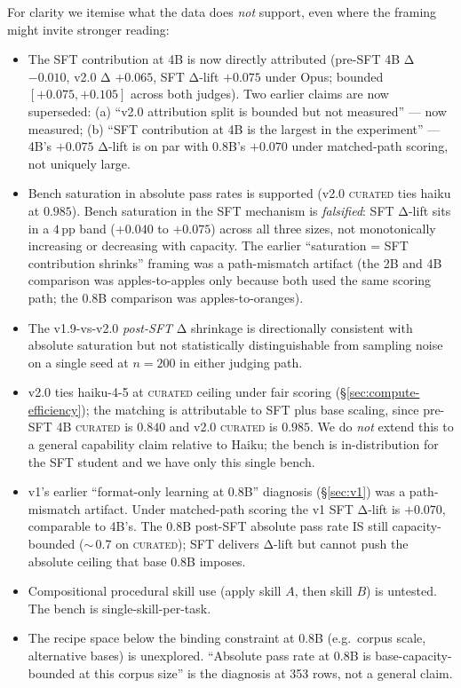 \documentclass[10pt]{article}
\newcommand{\CU}{\textsc{curated}\xspace}
\begin{document}
For clarity we itemise what the data does \emph{not} support, even where the framing might invite stronger reading:
\begin{itemize}[leftmargin=*, nosep]
  \item The SFT contribution at 4B is now directly attributed (pre-SFT 4B Δ $-0.010$, v2.0 Δ $+0.065$, SFT Δ-lift $+0.075$ under Opus; bounded $[+0.075, +0.105]$ across both judges). Two earlier claims are now superseded: (a) ``v2.0 attribution split is bounded but not measured'' --- now measured; (b) ``SFT contribution at 4B is the largest in the experiment'' --- 4B's $+0.075$ Δ-lift is on par with 0.8B's $+0.070$ under matched-path scoring, not uniquely large.
  \item Bench saturation in absolute pass rates is supported (v2.0 \CU{} ties haiku at $0.985$). Bench saturation in the SFT mechanism is \emph{falsified}: SFT Δ-lift sits in a $4$\,pp band ($+0.040$ to $+0.075$) across all three sizes, not monotonically increasing or decreasing with capacity. The earlier ``saturation = SFT contribution shrinks'' framing was a path-mismatch artifact (the 2B and 4B comparison was apples-to-apples only because both used the same scoring path; the 0.8B comparison was apples-to-oranges).
  \item The v1.9-vs-v2.0 \emph{post-SFT} Δ shrinkage is directionally consistent with absolute saturation but not statistically distinguishable from sampling noise on a single seed at $n{=}200$ in either judging path.
  \item v2.0 ties haiku-4-5 at \CU{} ceiling under fair scoring (\S\ref{sec:compute-efficiency}); the matching is attributable to SFT plus base scaling, since pre-SFT 4B \CU{} is $0.840$ and v2.0 \CU{} is $0.985$. We do \emph{not} extend this to a general capability claim relative to Haiku; the bench is in-distribution for the SFT student and we have only this single bench.
  \item v1's earlier ``format-only learning at 0.8B'' diagnosis (\S\ref{sec:v1}) was a path-mismatch artifact. Under matched-path scoring the v1 SFT Δ-lift is $+0.070$, comparable to 4B's. The 0.8B post-SFT absolute pass rate IS still capacity-bounded ($\sim$\,$0.7$ on \CU); SFT delivers Δ-lift but cannot push the absolute ceiling that base 0.8B imposes.
  \item Compositional procedural skill use (apply skill $A$, then skill $B$) is untested. The bench is single-skill-per-task.
  \item The recipe space below the binding constraint at 0.8B (e.g.\ corpus scale, alternative bases) is unexplored. ``Absolute pass rate at 0.8B is base-capacity-bounded at this corpus size'' is the diagnosis at 353 rows, not a general claim.

\end{itemize}
\end{document}
